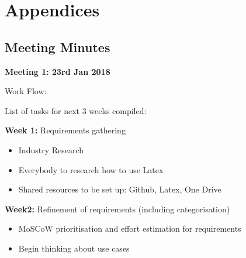 \newpage

% 

\printbibliography


\newpage
\section{Appendices}

\subsection{Meeting Minutes}

\textbf{Meeting 1: 23rd Jan 2018}

Work Flow:

List of tasks for next 3 weeks compiled:

\textbf{Week 1:} Requirements gathering

\begin{itemize}
  \item Industry Research
  \item Everybody to research how to use Latex
  \item Shared resources to be set up: Github, Latex, One Drive

\end{itemize}


\textbf{Week2:} Refinement of requirements (including categorisation)

\begin{itemize}
  \item MoSCoW prioritisation and effort estimation for requirements
  \item Begin thinking about use cases


\end{itemize}


